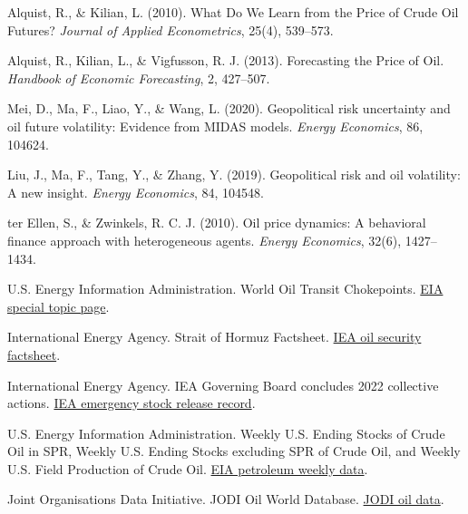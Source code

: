 {\begin{enumerate}[label={[\arabic*]},leftmargin=2.2em,itemsep=0.42em,topsep=0.25em]
\item
Alquist, R., \& Kilian, L. (2010). What Do We Learn from the Price of Crude Oil Futures? \textit{Journal of Applied Econometrics}, 25(4), 539--573.

\item
Alquist, R., Kilian, L., \& Vigfusson, R. J. (2013). Forecasting the Price of Oil. \textit{Handbook of Economic Forecasting}, 2, 427--507.

\item
Mei, D., Ma, F., Liao, Y., \& Wang, L. (2020). Geopolitical risk uncertainty and oil future volatility: Evidence from MIDAS models. \textit{Energy Economics}, 86, 104624.

\item
Liu, J., Ma, F., Tang, Y., \& Zhang, Y. (2019). Geopolitical risk and oil volatility: A new insight. \textit{Energy Economics}, 84, 104548.

\item
ter Ellen, S., \& Zwinkels, R. C. J. (2010). Oil price dynamics: A behavioral finance approach with heterogeneous agents. \textit{Energy Economics}, 32(6), 1427--1434.

\item
U.S. Energy Information Administration. World Oil Transit Chokepoints. \href{https://www.eia.gov/international/analysis/special-topics/World_Oil_Transit_Chokepoints}{EIA special topic page}.

\item
International Energy Agency. Strait of Hormuz Factsheet. \href{https://www.iea.org/about/oil-security-and-emergency-response/strait-of-hormuz}{IEA oil security factsheet}.

\item
International Energy Agency. IEA Governing Board concludes 2022 collective actions. \href{https://www.iea.org/news/iea-governing-board-concludes-2022-collective-actions}{IEA emergency stock release record}.

\item
U.S. Energy Information Administration. Weekly U.S. Ending Stocks of Crude Oil in SPR, Weekly U.S. Ending Stocks excluding SPR of Crude Oil, and Weekly U.S. Field Production of Crude Oil. \href{https://www.eia.gov/dnav/pet/pet_sum_sndw_dcus_nus_w.htm}{EIA petroleum weekly data}.

\item
Joint Organisations Data Initiative. JODI Oil World Database. \href{https://www.jodidata.org/oil/}{JODI oil data}.


\end{enumerate}}
